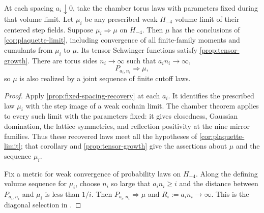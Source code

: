 \begin{corollary}\label{cor:prescribed-volume-first}
At each spacing $a_i\downarrow0$, take the chamber torus laws
with parameters fixed during that volume limit. Let $\mu_i$
be any prescribed weak $H_{-4}$ volume limit of their
centered step fields. Suppose $\mu_i\Longrightarrow\mu$ on
$H_{-4}$. Then $\mu$ has the conclusions of
\cref{cor:plaquette-limit}, including convergence of all
finite-family moments and cumulants from $\mu_i$ to $\mu$.
Its tensor Schwinger functions satisfy \cref{prop:tensor-growth}.
There are torus sides $n_i\to\infty$ such that
$a_in_i\to\infty$,
\[
 P_{a_i,n_i}\Longrightarrow\mu,
\]
so $\mu$ is also realized by a joint sequence of finite
cutoff laws.
\end{corollary}

\begin{proof}
Apply \cref{prop:fixed-spacing-recovery} at each $a_i$.
It identifies the prescribed law $\mu_i$ with the step image
of a weak cochain limit. The chamber theorem
\cite[Theorem~A]{ChamberLattice} applies to every such limit
with the parameters fixed: it gives closedness, Gaussian
domination, the lattice symmetries, and reflection positivity
at the nine mirror families. Thus these recovered laws meet
all the hypotheses of \cref{cor:plaquette-limit}; that
corollary and \cref{prop:tensor-growth} give the assertions
about $\mu$ and the sequence $\mu_i$.

Fix a metric for weak convergence of probability laws on
$H_{-4}$. Along the defining volume sequence for $\mu_i$,
choose $n_i$ so large that $a_in_i\ge i$ and the distance
between $P_{a_i,n_i}$ and $\mu_i$ is less than $1/i$.
Then $P_{a_i,n_i}\Longrightarrow\mu$ and
$R_i:=a_in_i\to\infty$. This is the diagonal selection in
\cite[proof of Proposition~6.1]{QED3Manuscript}.
\end{proof}

\printbibliography

